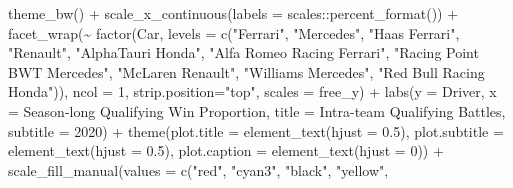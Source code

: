 \documentclass[
]{book}
\newenvironment{Shaded}{\begin{snugshade}}{\end{snugshade}}
\newcommand{\AttributeTok}[1]{\textcolor[rgb]{0.77,0.63,0.00}{#1}}
\newcommand{\DecValTok}[1]{\textcolor[rgb]{0.00,0.00,0.81}{#1}}
\newcommand{\FloatTok}[1]{\textcolor[rgb]{0.00,0.00,0.81}{#1}}
\newcommand{\FunctionTok}[1]{\textcolor[rgb]{0.00,0.00,0.00}{#1}}
\newcommand{\NormalTok}[1]{#1}
\newcommand{\SpecialCharTok}[1]{\textcolor[rgb]{0.00,0.00,0.00}{#1}}
\newcommand{\StringTok}[1]{\textcolor[rgb]{0.31,0.60,0.02}{#1}}
\begin{document}
\begin{Shaded}
\begin{Highlighting}[]
  \FunctionTok{theme\_bw}\NormalTok{() }\SpecialCharTok{+}
  \FunctionTok{scale\_x\_continuous}\NormalTok{(}\AttributeTok{labels =}\NormalTok{ scales}\SpecialCharTok{::}\FunctionTok{percent\_format}\NormalTok{()) }\SpecialCharTok{+}
  \FunctionTok{facet\_wrap}\NormalTok{(}\SpecialCharTok{\textasciitilde{}} \FunctionTok{factor}\NormalTok{(Car,}
                      \AttributeTok{levels =} \FunctionTok{c}\NormalTok{(}\StringTok{"Ferrari"}\NormalTok{,}
                                 \StringTok{"Mercedes"}\NormalTok{,}
                                 \StringTok{"Haas Ferrari"}\NormalTok{,}
                                 \StringTok{"Renault"}\NormalTok{,}
                                 \StringTok{"AlphaTauri Honda"}\NormalTok{,}
                                 \StringTok{"Alfa Romeo Racing Ferrari"}\NormalTok{, }
                                 \StringTok{"Racing Point BWT Mercedes"}\NormalTok{,}
                                 \StringTok{"McLaren Renault"}\NormalTok{,}
                                 \StringTok{"Williams Mercedes"}\NormalTok{,}
                                 \StringTok{"Red Bull Racing Honda"}\NormalTok{)), }\AttributeTok{ncol =} \DecValTok{1}\NormalTok{, }\AttributeTok{strip.position=}\StringTok{"top"}\NormalTok{, }\AttributeTok{scales =} \StringTok{\textquotesingle{}free\_y\textquotesingle{}}\NormalTok{) }\SpecialCharTok{+}
  \FunctionTok{labs}\NormalTok{(}\AttributeTok{y =} \StringTok{\textquotesingle{}Driver\textquotesingle{}}\NormalTok{,}
       \AttributeTok{x =} \StringTok{\textquotesingle{}Season{-}long Qualifying Win Proportion\textquotesingle{}}\NormalTok{,}
       \AttributeTok{title =} \StringTok{\textquotesingle{}Intra{-}team Qualifying Battles\textquotesingle{}}\NormalTok{,}
       \AttributeTok{subtitle =} \StringTok{\textquotesingle{}2020\textquotesingle{}}\NormalTok{) }\SpecialCharTok{+}
  \FunctionTok{theme}\NormalTok{(}\AttributeTok{plot.title =} \FunctionTok{element\_text}\NormalTok{(}\AttributeTok{hjust =} \FloatTok{0.5}\NormalTok{),}
        \AttributeTok{plot.subtitle =} \FunctionTok{element\_text}\NormalTok{(}\AttributeTok{hjust =} \FloatTok{0.5}\NormalTok{),}
        \AttributeTok{plot.caption =} \FunctionTok{element\_text}\NormalTok{(}\AttributeTok{hjust =} \DecValTok{0}\NormalTok{)) }\SpecialCharTok{+}
  \FunctionTok{scale\_fill\_manual}\NormalTok{(}\AttributeTok{values =} \FunctionTok{c}\NormalTok{(}\StringTok{"red"}\NormalTok{, }
                                \StringTok{"cyan3"}\NormalTok{,  }
                                \StringTok{"black"}\NormalTok{, }
                                \StringTok{"yellow"}\NormalTok{,}

\end{Highlighting}
\end{Shaded}
\end{document}
